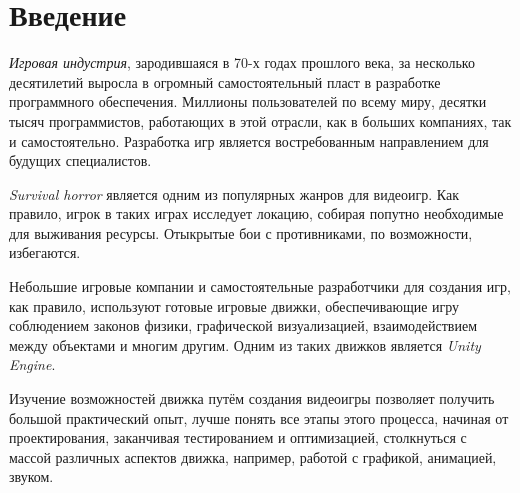 
\section*{Введение}
\thispagestyle{withCompileDate}

\textit{Игровая индустрия}, зародившаяся в 70-х годах прошлого века, за несколько десятилетий выросла в огромный самостоятельный пласт в разработке программного обеспечения. Миллионы пользователей по всему миру, десятки тысяч программистов, работающих в этой отрасли, как в больших компаниях, так и самостоятельно. Разработка игр является востребованным направлением для будущих специалистов.

\textit{Survival horror} является одним из популярных жанров для видеоигр. Как правило, игрок в таких играх исследует локацию, собирая попутно необходимые для выживания ресурсы. Отыкрытые бои с противниками, по возможности, избегаются.

Небольшие игровые компании и самостоятельные разработчики для создания игр, как правило, используют готовые игровые движки, обеспечивающие игру соблюдением законов физики, графической визуализацией, взаимодействием между объектами и многим другим. Одним из таких движков является \textit{Unity Engine}.

Изучение возможностей движка путём создания видеоигры позволяет получить большой практический опыт, лучше понять все этапы этого процесса, начиная от проектирования, заканчивая тестированием и оптимизацией, столкнуться с массой различных аспектов движка, например, работой с графикой, анимацией, звуком. 
